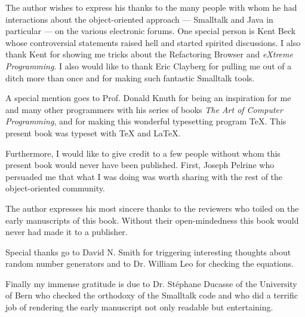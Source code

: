 \documentclass[twoside]{book}
\begin{document}
%
The author wishes to express his
thanks to the many people with whom he had interactions about the
object-oriented approach --- Smalltalk and Java in particular ---
on the various electronic forums. One special person is Kent Beck
whose controversial statements raised hell and started spirited
discussions. I also thank Kent for showing me tricks about the
Refactoring Browser and {\sl eXtreme Programming}. I also would
like to thank Eric Clayberg for pulling me out of a ditch more
than once and for making such fantastic Smalltalk tools.

A special mention goes to Prof. Donald Knuth for being an
inspiration for me and many other programmers with his series of
books {\sl The Art of Computer Programming}, and for making this
wonderful typesetting program \TeX. This present book was typeset
with \TeX{} and \LaTeX.

Furthermore, I would like to give credit to a few people without
whom this present book would never have been published. First,
Joseph Pelrine who persuaded me that what I was doing was worth
sharing with the rest of the object-oriented community.

The author expresses his most sincere thanks to the reviewers who
toiled on the early manuscripts of this book. Without their
open-mindedness this book would never had made it to a publisher.

Special thanks go to David N. Smith for triggering interesting
thoughts about random number generators and to Dr. William Leo for
checking the equations.

Finally my immense gratitude is due to Dr. St\'ephane Ducasse of the
University of Bern who checked the orthodoxy of the Smalltalk code
and who did a terrific job of rendering the early manuscript not
only readable but entertaining.

\bigskip
{}


\ifx\wholebook\relax\else
\end{document}
